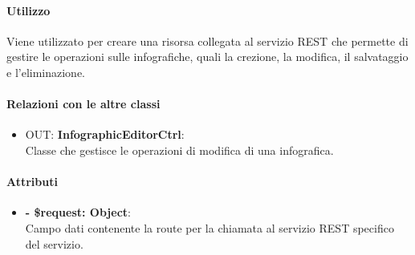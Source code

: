 		\paragraph{Utilizzo}
		Viene utilizzato per creare una risorsa collegata al servizio \gls{REST} che permette di gestire le operazioni sulle infografiche, quali la crezione, la modifica, il salvataggio e l'eliminazione.
		
		\paragraph{Relazioni con le altre classi}
		\begin{itemize}
			\item OUT: \textbf{InfographicEditorCtrl}:\\
			Classe che gestisce le operazioni di modifica di una \gls{infografica}.
		\end{itemize}
		
		\paragraph{Attributi}
		\begin{itemize}
			\item \textbf{- \$request: Object}:\\
			Campo dati contenente la route per la chiamata al servizio \gls{REST} specifico del servizio.
		\end{itemize}	
		
